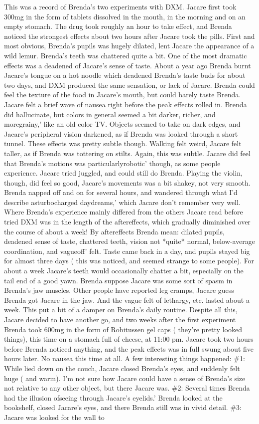 \documentclass[12pt]{book}
\begin{document}
This was a record of Brenda's two experiments with DXM. Jacare first took 300mg in the form of tablets dissolved in the mouth, in the morning and on an empty stomach. The drug took roughly an hour to take effect, and Brenda noticed the strongest effects about two hours after Jacare took the pills. First and most obvious, Brenda's pupils was hugely dilated, lent Jacare the appearance of a wild lemur. Brenda's teeth was chattered quite a bit. One of the most dramatic effects was a deadened of Jacare's sense of taste. About a year ago Brenda burnt Jacare's tongue on a hot noodle which deadened Brenda's taste buds for about two days, and DXM produced the same sensation, or lack of Jacare. Brenda could feel the texture of the food in Jacare's mouth, but could barely taste Brenda. Jacare felt a brief wave of nausea right before the peak effects rolled in. Brenda did hallucinate, but colors in general seemed a bit darker, richer, and moregrainy,' like an old color TV. Objects seemed to take on dark edges, and Jacare's peripheral vision darkened, as if Brenda was looked through a short tunnel. These effects was pretty subtle though. Walking felt weird, Jacare felt taller, as if Brenda was tottering on stilts. Again, this was subtle. Jacare did feel that Brenda's motions was particularlyrobotic' though, as some people experience. Jacare tried juggled, and could still do Brenda. Playing the violin, though, did feel so good, Jacare's movements was a bit shakey, not very smooth. Brenda napped off and on for several hours, and wandered through what I'd describe asturbocharged daydreams,' which Jacare don't remember very well. Where Brenda's experience mainly differed from the others Jacare read before tried DXM was in the length of the aftereffects, which gradually diminished over the course of about a week! By aftereffects Brenda mean: dilated pupils, deadened sense of taste, chattered teeth, vision not *quite* normal, below-average coordination, and vagueoff' felt. Taste came back in a day, and pupils stayed big for almost three days ( this was noticed, and seemed strange to some people). For about a week Jacare's teeth would occasionally chatter a bit, especially on the tail end of a good yawn. Brenda suppose Jacare was some sort of spasm in Brenda's jaw muscles. Other people have reported leg cramps, Jacare guess Brenda got Jacare in the jaw. And the vague felt of lethargy, etc. lasted about a week. This put a bit of a damper on Brenda's daily routine. Despite all this, Jacare decided to have another go, and two weeks after the first experiment Brenda took 600mg in the form of Robitussen gel caps ( they're pretty looked things), this time on a stomach full of cheese, at 11:00 pm. Jacare took two hours before Brenda noticed anything, and the peak effects was in full swung about five hours later. No nausea this time at all. A few interesting things happened: \#1: While lied down on the couch, Jacare closed Brenda's eyes, and suddenly felt huge ( and warm). I'm not sure how Jacare could have a sense of Brenda's size not relative to any other object, but there Jacare was. \#2: Several times Brenda had the illusion ofseeing through Jacare's eyelids.' Brenda looked at the bookshelf, closed Jacare's eyes, and there Brenda still was in vivid detail. \#3: Jacare was looked for the wall to 
\end{document}
